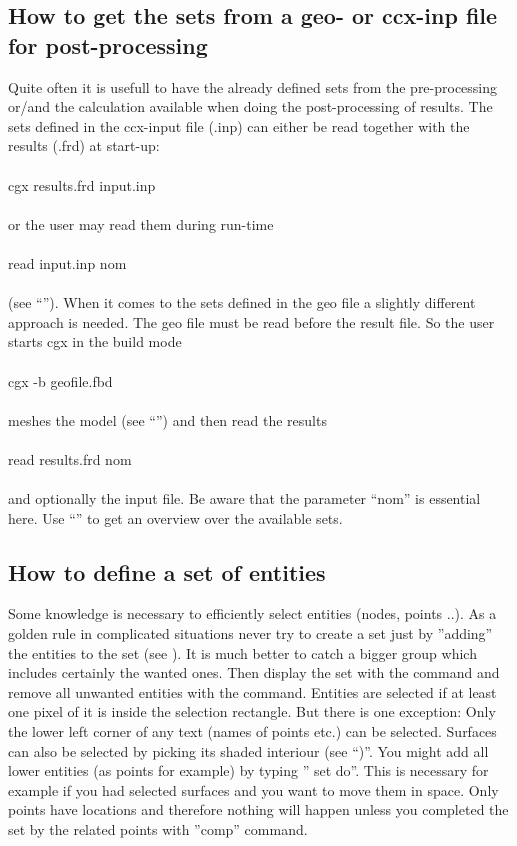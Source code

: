 \documentclass{article}
\begin{document}
\begin{appendix}
\subsection{\label{How to get the sets from a geo- or ccx-inp file for post-processing}How to get the sets from a geo- or ccx-inp file for post-processing}
Quite often it is usefull to have the already defined sets from the pre-processing or/and the calculation available when doing the post-processing of results. The sets defined in the ccx-input file (.inp) can either be read together with the results (.frd) at start-up:\\\\cgx results.frd input.inp\\\\or the user may read them during run-time\\\\read input.inp nom\\\\ (see ``''). When it comes to the sets defined in the geo file a slightly different approach is needed. The geo file must be read before the result file. So the user starts cgx in the build mode\\\\cgx -b geofile.fbd\\\\meshes the model (see ``'') and then read the results\\\\read results.frd nom\\\\and optionally the input file. Be aware that the parameter ``nom'' is essential here. Use ``'' to get an overview over the available sets.

\subsection{\label{How to define a set of entities}How to define a set of entities}
Some knowledge is necessary to efficiently select entities (nodes, points ..). As a golden rule in complicated situations never try to create a set just by ''adding'' the entities to the set (see ). It is much better to catch a bigger group which includes certainly the wanted ones. Then display the set with the  command and remove all unwanted entities with the  command. Entities are selected if at least one pixel of it is inside the selection rectangle. But there is one exception: Only the lower left corner of any text (names of points etc.) can be selected. Surfaces can also be selected by picking its shaded interiour (see ``)''. You might add all lower entities (as points for example) by typing '' set do''. This is necessary for example if you had selected surfaces and you want to move them in space. Only points have locations and therefore nothing will happen unless you completed the set by the related points with ''comp'' command.


\end{appendix}
\end{document}
